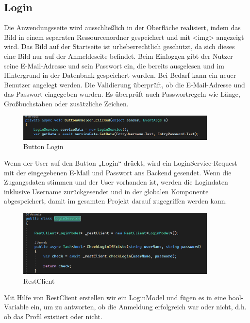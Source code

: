 \subsection{Login}
Die Anwendungsseite wird ausschließlich in der Oberfläche realisiert, 
indem das Bild in einem separaten Ressourcenordner gespeichert und mit <img> 
angezeigt wird. Das Bild auf der Startseite ist urheberrechtlich geschützt, 
da sich dieses eine Bild nur auf der Anmeldeseite befindet. Beim Einloggen gibt 
der Nutzer seine E-Mail-Adresse und sein Passwort ein, die bereits ausgelesen 
und im Hintergrund in der Datenbank gespeichert wurden. Bei Bedarf kann ein 
neuer Benutzer angelegt werden. Die Validierung überprüft, ob die E-Mail-Adresse 
und das Passwort eingegeben wurden. Es überprüft auch Passwortregeln wie Länge, 
Großbuchstaben oder zusätzliche Zeichen.
\begin{figure}[h]
    \begin{center}\includegraphics[width=10cm]{pics/Xamarin Frontend/1.png}
    \caption[Login]{Button Login}
    \end{center}
\end{figure}
\newline
Wenn der User auf den Button „Login“ drückt, wird ein LoginService-Request mit der
eingegebenen E-Mail und Passwort ans Backend gesendet. Wenn die Zugangsdaten
stimmen und der User vorhanden ist, werden die Logindaten inklusive Username
zurückgesendet und in der globalen Komponente abgespeichert, damit im gesamten
Projekt darauf zugegriffen werden kann.
\begin{figure}[h]
    \begin{center}\includegraphics[width=10cm]{pics/Xamarin Frontend/2.png}
    \caption[Login]{RestClient}
    \end{center}
\end{figure}
\newline
\newpage
Mit Hilfe von RestClient erstellen wir ein LoginModel und fügen es in eine bool-Variable ein, um zu antworten, ob die Anmeldung erfolgreich war oder nicht, d.h. ob das Profil existiert oder nicht.
